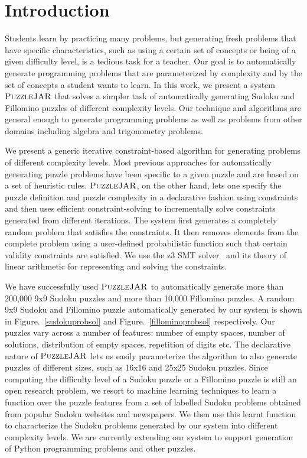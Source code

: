 \section{Introduction}

Students learn by practicing many problems, but generating fresh
problems that have specific characteristics, such as using a certain
set of concepts or being of a given difficulty level, is a tedious
task for a teacher. Our goal is to automatically generate programming
problems that are parameterized by complexity and by the set of
concepts a student wants to learn. In this work, we present a system
$\textsc{PuzzleJAR}$ that solves a simpler task of automatically generating
Sudoku and Fillomino puzzles of different complexity levels. Our
technique and algorithms are general enough to generate programming
problems as well as problems from other domains including algebra and
trigonometry problems.

We present a generic iterative constraint-based algorithm for
generating problems of different complexity levels. Most previous
approaches for automatically generating puzzle problems have been
specific to a given puzzle and are based on a set of heuristic
rules. $\textsc{PuzzleJAR}$, on the other hand, lets one specify the puzzle
definition and puzzle complexity in a declarative fashion using
constraints and then uses efficient constraint-solving to
incrementally solve constraints generated from different
iterations. The system first generates a completely random problem
that satisfies the constraints. It then removes elements from the
complete problem using a user-defined probabilistic function such that
certain validity constraints are satisfied. We use the z3 SMT
solver~\cite{z3} and its theory of linear arithmetic for representing
and solving the constraints.

We have successfully used $\textsc{PuzzleJAR}$ to automatically generate more
than 200,000 9x9 Sudoku puzzles and more than 10,000 Fillomino
puzzles. A random 9x9 Sudoku and Fillomino puzzle automatically
generated by our system is shown in Figure.~\ref{sudokuprobsol} and
Figure.~\ref{fillominoprobsol} respectively. Our puzzles vary across a
number of features: number of empty spaces, number of solutions,
distribution of empty spaces, repetition of digits etc. The
declarative nature of $\textsc{PuzzleJAR}$ lets us easily parameterize the
algorithm to also generate puzzles of different sizes, such as 16x16
and 25x25 Sudoku puzzles. Since computing the difficulty level of a
Sudoku puzzle or a Fillomino puzzle is still an open research problem,
we resort to machine learning techniques to learn a function over the
puzzle features from a set of labelled Sudoku problems obtained from
popular Sudoku websites and newspapers. We then use this learnt
function to characterize the Sudoku problems generated by our system
into different complexity levels. We are currently extending our
system to support generation of Python programming problems and other
puzzles.

